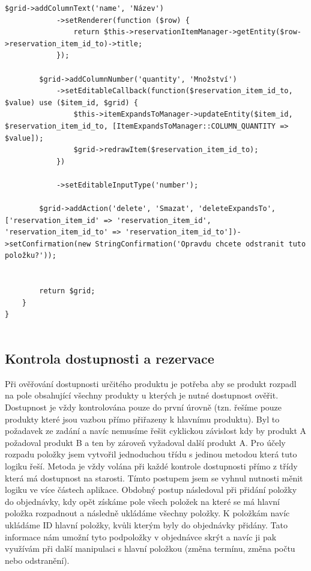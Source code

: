 \begin{lstlisting}[label=src:GenerateStockTakingDocumentFormFactory,caption={Továrna editovatelné tabulky pro správu vazeb produktů}]
        $grid->addColumnText('name', 'Název')
            ->setRenderer(function ($row) {
                return $this->reservationItemManager->getEntity($row->reservation_item_id_to)->title;
            });

        $grid->addColumnNumber('quantity', 'Množství')
            ->setEditableCallback(function($reservation_item_id_to, $value) use ($item_id, $grid) {
                $this->itemExpandsToManager->updateEntity($item_id, $reservation_item_id_to, [ItemExpandsToManager::COLUMN_QUANTITY => $value]);
                $grid->redrawItem($reservation_item_id_to);
            })

            ->setEditableInputType('number');

        $grid->addAction('delete', 'Smazat', 'deleteExpandsTo', ['reservation_item_id' => 'reservation_item_id', 'reservation_item_id_to' => 'reservation_item_id_to'])->setConfirmation(new StringConfirmation('Opravdu chcete odstranit tuto položku?'));


        return $grid;
    }
}


\end{lstlisting}


\subsection{Kontrola dostupnosti a rezervace}

Při ověřování dostupnosti určitého produktu je potřeba aby se produkt rozpadl na pole obsahující všechny produkty u kterých je nutné dostupnost ověřit. Dostupnost je vždy kontrolována pouze do první úrovně (tzn. řešíme pouze produkty které jsou vazbou přímo přiřazeny k hlavnímu produktu). Byl to požadavek ze zadání a navíc nemusíme řešit cyklickou závislost kdy by produkt A požadoval produkt B a ten by zároveň vyžadoval další produkt A.
Pro účely rozpadu položky jsem vytvořil jednoduchou třídu s jedinou metodou která tuto logiku řeší. Metoda je vždy volána při každé kontrole dostupnosti přímo z třídy která má dostupnost na starosti. Tímto postupem jsem se vyhnul nutnosti měnit logiku ve více částech aplikace.
Obdobný postup následoval při přidání položky do objednávky, kdy opět získáme pole všech položek na které se má hlavní položka rozpadnout a následně ukládáme všechny položky. K položkám navíc ukládáme ID hlavní položky, kvůli kterým byly do objednávky přidány.
Tato informace nám umožní tyto podpoložky v objednávce skrýt a navíc ji pak využívám při další manipulaci s hlavní položkou (změna termínu, změna počtu nebo odstranění).


